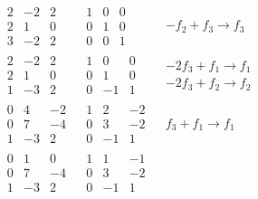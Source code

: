 	\begin{align*}
		&\begin{array}{l|lr}
			\begin{matrix}
				2&-2&2\\
				2&1&0\\
				3&-2&2
			\end{matrix} & \begin{matrix}
				1&0&0\\
				0&1&0\\
				0&0&1
			\end{matrix} & \begin{matrix}
				-f_2+f_3\rightarrow f_3
			\end{matrix}\\
			\hline
			\begin{matrix}
				2&-2&2\\
				2&1&0\\
				1&-3&2
			\end{matrix} & \begin{matrix}
				1&0&0\\
				0&1&0\\
				0&-1&1
			\end{matrix} & \begin{matrix}
				-2f_3+f_1\rightarrow f_1\\
				-2f_3+f_2\rightarrow f_2
			\end{matrix}\\
			\hline
			\begin{matrix}
				0&4&-2\\
				0&7&-4\\
				1&-3&2
			\end{matrix} & \begin{matrix}
				1&2&-2\\
				0&3&-2\\
				0&-1&1
			\end{matrix} & \begin{matrix}
				f_3+f_1\rightarrow f_1
			\end{matrix}\\
			\hline
			\begin{matrix}
				0&1&0\\
				0&7&-4\\
				1&-3&2
			\end{matrix} & \begin{matrix}
				1&1&-1\\
				0&3&-2\\
				0&-1&1
			\end{matrix} & \begin{matrix}

\end{matrix}
\end{array}
\end{align*}
